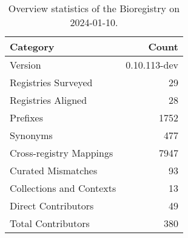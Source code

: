 \begin{table}
\caption{Overview statistics of the Bioregistry on 2024-01-10.}
\label{tab:bioregistry-summary}
\begin{tabular}{lr}
\toprule
Category & Count \\
\midrule
Version & 0.10.113-dev \\
Registries Surveyed & 29 \\
Registries Aligned & 28 \\
Prefixes & 1752 \\
Synonyms & 477 \\
Cross-registry Mappings & 7947 \\
Curated Mismatches & 93 \\
Collections and Contexts & 13 \\
Direct Contributors & 49 \\
Total Contributors & 380 \\
\bottomrule
\end{tabular}
\end{table}
